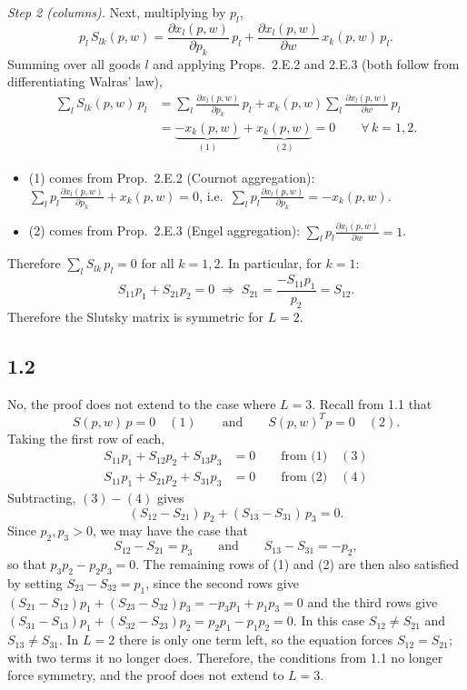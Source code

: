 \documentclass[12pt,letterpaper]{article}
\begin{document}
\textit{Step 2 (columns).} Next, multiplying by $p_l$,
\[
p_l\, S_{lk}(p,w)
= \frac{\partial x_l(p,w)}{\partial p_k}\,p_l
+ \frac{\partial x_l(p,w)}{\partial w}\, x_k(p,w)\,p_l .
\]
Summing over all goods $l$ and applying Props.~2.E.2 and 2.E.3 (both follow from differentiating Walras' law),
\begin{align*}
\sum_l S_{lk}(p,w)\,p_l
&= \sum_l \frac{\partial x_l(p,w)}{\partial p_k}\,p_l
 + x_k(p,w)\sum_l \frac{\partial x_l(p,w)}{\partial w}\,p_l \\
&= \underbrace{-x_k(p,w)}_{(1)} + \underbrace{x_k(p,w)}_{(2)} = 0
\qquad \forall\, k=1,2 .
\end{align*}
\begin{itemize}
  \item (1) comes from Prop.~2.E.2 (Cournot aggregation):
  $\displaystyle\sum_l p_l\frac{\partial x_l(p,w)}{\partial p_k} + x_k(p,w) = 0$, i.e.\
  $\displaystyle\sum_l p_l\frac{\partial x_l(p,w)}{\partial p_k} = -x_k(p,w)$.
  \item (2) comes from Prop.~2.E.3 (Engel aggregation):
  $\displaystyle\sum_l p_l\frac{\partial x_l(p,w)}{\partial w} = 1$.
\end{itemize}
Therefore $\sum_l S_{lk}\,p_l = 0$ for all $k=1,2$. In particular, for $k=1$:
\[
S_{11}p_1 + S_{21}p_2 = 0 \;\Longrightarrow\; S_{21} = \frac{-S_{11}p_1}{p_2} = S_{12}.
\]
Therefore the Slutsky matrix is symmetric for $L=2$.



\subsection*{1.2}

No, the proof does not extend to the case where $L=3$. Recall from 1.1 that
\[
S(p,w)\,p = 0 \quad (1) \qquad\text{and}\qquad S(p,w)^{T} p = 0 \quad (2).
\]
Taking the first row of each,
\begin{align*}
S_{11}p_1 + S_{12}p_2 + S_{13}p_3 &= 0 \qquad \text{from (1)} \quad (3)\\
S_{11}p_1 + S_{21}p_2 + S_{31}p_3 &= 0 \qquad \text{from (2)} \quad (4)
\end{align*}
Subtracting, $(3)-(4)$ gives
\[
(S_{12}-S_{21})\,p_2 + (S_{13}-S_{31})\,p_3 = 0 .
\]
Since $p_2, p_3 > 0$, we may have the case that
\[
S_{12}-S_{21} = p_3 \qquad\text{and}\qquad S_{13}-S_{31} = -p_2,
\]
so that $p_3p_2 - p_2p_3 = 0$. The remaining rows of (1) and (2) are then also satisfied by setting $S_{23}-S_{32} = p_1$, since the second rows give $(S_{21}-S_{12})p_1 + (S_{23}-S_{32})p_3 = -p_3p_1 + p_1p_3 = 0$ and the third rows give $(S_{31}-S_{13})p_1 + (S_{32}-S_{23})p_2 = p_2p_1 - p_1p_2 = 0$. In this case $S_{12}\neq S_{21}$ and $S_{13}\neq S_{31}$. In $L=2$ there is only one term left, so the equation forces $S_{12}=S_{21}$; with two terms it no longer does. Therefore, the conditions from 1.1 no longer force symmetry, and the proof does not extend to $L=3$.
\end{document}
